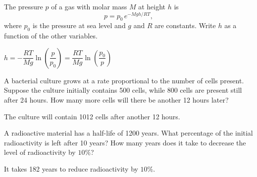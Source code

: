 \ifcalculus
\begin{Exercise}[difficulty=1] The pressure $p$ of a gas with molar mass $M$ at height $h$ is
\[ p = p_0\,e^{-Mgh/RT}, \]
where $p_0$ is the pressure at sea level and $g$ and $R$ are constants. Write $h$ as a function of the other variables.

\end{Exercise}

\begin{Answer}\phantom{}
    $h = -\dfrac{RT}{Mg}\ln\left(\dfrac{p}{p_0}\right)=\dfrac{RT}{Mg}\ln\left(\dfrac{p_0}{p}\right)$
\end{Answer}

\fi

\begin{Exercise}[difficulty=1] A  bacterial culture grows at a rate proportional to the number of cells present. Suppose the culture initially contains 500 cells, while 800 cells are  present still after 24 hours. How many more cells will there be another 12 hours later? 

\end{Exercise}

\begin{Answer}\phantom{}
    The culture will contain 1012 cells after another 12 hours.
\end{Answer}

\begin{Exercise}[difficulty=2] A radioactive material has a half-life of 1200 years. What percentage of the initial radioactivity is left after 10 years? How many years does it take to decrease the level of radioactivity by $10 \%$? 

\end{Exercise}

\begin{Answer}\phantom{}
    It takes 182 years to reduce radioactivity by $10\%$.
\end{Answer}

